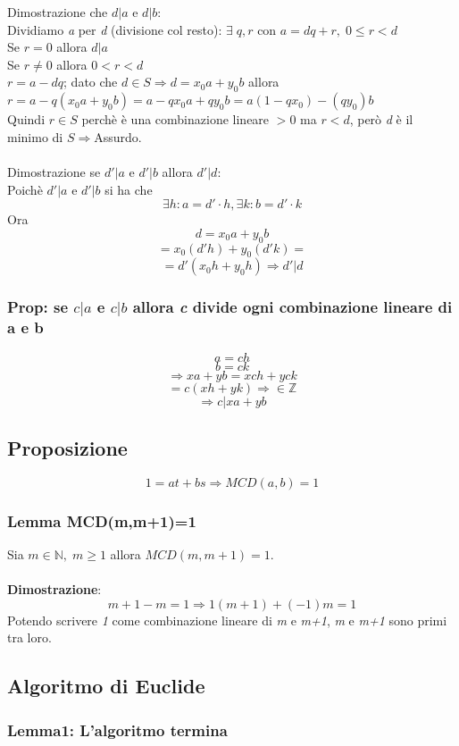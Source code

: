 Dimostrazione che \(d|a\) e \(d|b\):
\\
Dividiamo \textit{a} per \textit{d} (divisione col resto):
\(\exists\; q,r\) con \(a=dq+r,\; 0\leq r<d\)
\\
Se \(r=0\) allora \(d|a\)
\\
Se \(r\neq 0\) allora \(0<r<d\)
\\
\(r=a-dq\); dato che \(d\in S\Rightarrow d=x_0a+y_0b\) allora\\ \(r=a-q(x_0a+y_0b)=a-qx_0a+qy_0b=a(1-qx_0)-(qy_0)b\)
\\
Quindi \(r\in S\) perchè è una combinazione lineare \(>0\) ma \(r<d\), però \textit{d} è il minimo di \(S\Rightarrow\)Assurdo.
\\\\
Dimostrazione se \(d'|a\) e \(d'|b\) allora \(d'|d\):
\\
Poichè \(d'|a\) e \(d'|b\) si ha che
\[\exists h:a=d'\cdot h, \exists k:b=d'\cdot k\]
Ora \[d=x_0a+y_0b\]
\[=x_0(d'h)+y_0(d'k)=\]
\[=d'(x_0h+y_0h)\Rightarrow d'|d\]

\subsubsection{Prop: se \(c|a\) e \(c|b\) allora \textit{c} divide ogni combinazione lineare di a e b}
\[a=ch\]
\[b=ck\]
\[\Rightarrow xa+yb=xch+yck\]
\[=c(xh+yk)\Rightarrow\in\mathbb{Z}\]
\[\Rightarrow c|xa+yb\]

\subsection{Proposizione}
\[1=at+bs\Rightarrow MCD(a,b)=1\]

\subsubsection{Lemma MCD(m,m+1)=1}
Sia \(m\in\mathbb{N},\; m\geq 1\) allora \(MCD(m,m+1)=1\).
\\\\
\textbf{Dimostrazione}: \[m+1-m=1\Rightarrow 1(m+1)+(-1)m=1\]
Potendo scrivere \textit{1} come combinazione lineare di \textit{m} e \textit{m+1}, \textit{m} e \textit{m+1} sono primi tra loro.

\subsection{Algoritmo di Euclide}

\subsubsection{Lemma1: L'algoritmo termina}

